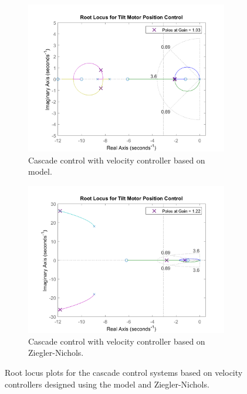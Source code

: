 \documentclass[../../main.tex]{subfiles}
\begin{document}
\begin{figure}[h]
\begin{subfigure}{0.48\textwidth}
    \includegraphics[width = 0.97\textwidth]{Sections/System_Design/Images/RL_cascadePP.png}
    \caption{Cascade control with velocity controller based on model.}
    \label{fig:RL_cascade_PP}
\end{subfigure}\quad
\begin{subfigure}{0.48\textwidth}
    \includegraphics[width = 0.97\textwidth]{Sections/System_Design/Images/RL_cascadeNZ.png}
    \caption{Cascade control with velocity controller based on Ziegler-Nichols.}
    \label{fig:RL_cascade_NZ}
\end{subfigure}
\caption{Root locus plots for the cascade control systems based on velocity controllers designed using the model and Ziegler-Nichols.}
\label{fig:RL_cascade}
\end{figure}
\end{document}
